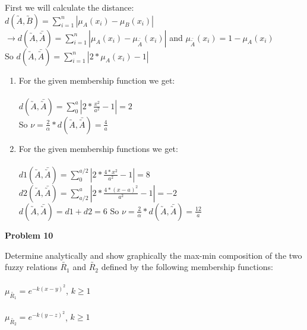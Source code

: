 \documentclass{article}
\begin{document}
\noindent First we will calculate the distance: \\ 
$d(\utilde A,\utilde B) = \sum_{i=1}^{n} | \mu_A(x_i) -  \mu_B(x_i)|$
  $\rightarrow d(\utilde A,\bar{ \utilde{ A}} ) = \sum_{i=1}^{n} | \mu_A(x_i) -  \mu_{\bar{ \utilde{ A}}}(x_i)|$ 
  and $\mu_{\bar{ \utilde{ A}}}(x_i) = 1 - \mu_A(x_i)$ \\
  So $ d(\utilde A,\bar{ \utilde{ A}} ) = \sum_{i=1}^{n} | 2* \mu_A(x_i) -  1| $ \\
\begin{enumerate} [label = \Alph*]
\item
  For the given membership function we get:\\ \\
  $ d(\utilde A,\bar{ \utilde{ A}} ) = \sum_{0}^{a} | 2* \frac{x^2}{a^2} -  1| = 2 $ \\
  So $\nu = \frac{2}{\alpha}* d(\utilde A,\bar{ \utilde{ A}} ) = \frac{4}{a}$

  \item For the given membership functions we get:\\ \\
  $ d1(\utilde A,\bar{ \utilde{ A}} ) = \sum_{0}^{a/2} | 2* \frac{4*x^2}{a^2} -  1| = 8 $ \\
  $ d2(\utilde A,\bar{ \utilde{ A}} ) = \sum_{a/2}^{a} | 2* \frac{4*(x-a)^2}{a^2} -  1| = -2 $ \\
  $ d(\utilde A,\bar{ \utilde{ A}} ) = d1 + d2 = 6 $
  So $\nu = \frac{2}{\alpha}* d(\utilde A,\bar{ \utilde{ A}} ) = \frac{12}{a}$

\end{enumerate}



\newpage
\noindent \textbf{Problem 10}

\noindent Determine analytically and show graphically the max-min composition of the two fuzzy 
relations $\utilde{R_1}$ and $\utilde{R_2}$ defined by the following membership functions:\\ \\ $\mu_{\utilde{R_1}} = e^{-k(x-y)^2}$, $k \geq 1$
\\ \\ $\mu_{\utilde{R_2}} = e^{-k(y-z)^2}$, $k \geq 1$
\end{document}
